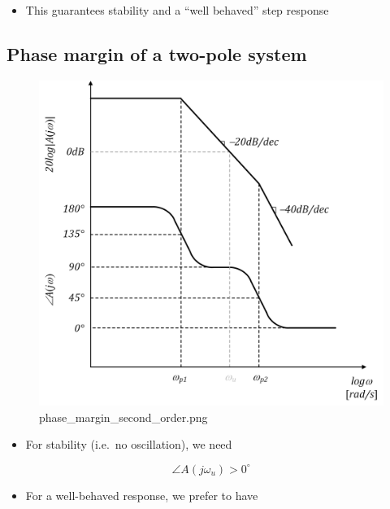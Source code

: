 \documentclass[11pt]{article}
\providecommand{\tightlist}{%
      \setlength{\itemsep}{0pt}\setlength{\parskip}{0pt}}
\begin{document}
\begin{itemize}
\tightlist
\item
  This guarantees stability and a ``well behaved'' step response
\end{itemize}

    \hypertarget{phase-margin-of-a-two-pole-system}{%
\subsection{Phase margin of a two-pole
system}\label{phase-margin-of-a-two-pole-system}}

    \begin{figure}
\centering
\includegraphics{phase_margin_second_order.png}
\caption{phase\_margin\_second\_order.png}
\end{figure}

    \begin{itemize}
\tightlist
\item
  For stability (i.e.~no oscillation), we need
\end{itemize}

\begin{equation}
\angle A(j\omega_u) > 0^{\circ}
\end{equation}

\begin{itemize}
\tightlist
\item
  For a well-behaved response, we prefer to have
\end{itemize}
\end{document}
